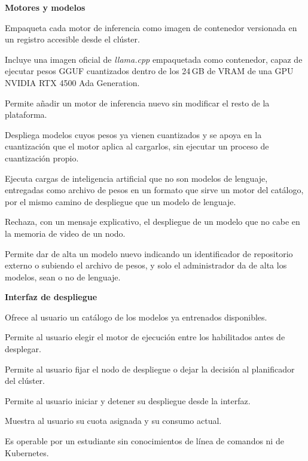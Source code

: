 \noindent\textbf{Motores y modelos}
\begin{description}
\setlength{\itemsep}{4pt}
  \item[R3-22] Empaqueta cada motor de inferencia como imagen de contenedor versionada en un registro accesible desde el clúster.
  \item[R3-23] Incluye una imagen oficial de \emph{llama.cpp} empaquetada como contenedor, capaz de ejecutar pesos GGUF cuantizados dentro de los 24\,GB de VRAM de una GPU NVIDIA RTX 4500 Ada Generation.
  \item[R3-25] Permite añadir un motor de inferencia nuevo sin modificar el resto de la plataforma.
  \item[R3-26] Despliega modelos cuyos pesos ya vienen cuantizados y se apoya en la cuantización que el motor aplica al cargarlos, sin ejecutar un proceso de cuantización propio.
  \item[R3-27] Ejecuta cargas de inteligencia artificial que no son modelos de lenguaje, entregadas como archivo de pesos en un formato que sirve un motor del catálogo, por el mismo camino de despliegue que un modelo de lenguaje.
  \item[R3-28] Rechaza, con un mensaje explicativo, el despliegue de un modelo que no cabe en la memoria de video de un nodo.
  \item[R3-29] Permite dar de alta un modelo nuevo indicando un identificador de repositorio externo o subiendo el archivo de pesos, y solo el administrador da de alta los modelos, sean o no de lenguaje.
\end{description}

\noindent\textbf{Interfaz de despliegue}
\begin{description}
\setlength{\itemsep}{4pt}
  \item[R3-31] Ofrece al usuario un catálogo de los modelos ya entrenados disponibles.
  \item[R3-32] Permite al usuario elegir el motor de ejecución entre los habilitados antes de desplegar.
  \item[R3-33] Permite al usuario fijar el nodo de despliegue o dejar la decisión al planificador del clúster.
  \item[R3-34] Permite al usuario iniciar y detener su despliegue desde la interfaz.
  \item[R3-35] Muestra al usuario su cuota asignada y su consumo actual.
  \item[R3-36] Es operable por un estudiante sin conocimientos de línea de comandos ni de Kubernetes.
\end{description}

